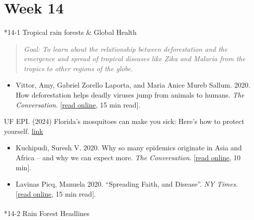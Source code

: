 \documentclass[
  10pt,
  letterpaper,
  oneside,
  open=any]{scrbook}
\makeatletter
\let\oldparagraph\paragraph
\renewcommand{\paragraph}{
    \@ifstar
      \xxxParagraphStar
      \xxxParagraphNoStar
  }
\newcommand{\xxxParagraphStar}[1]{\oldparagraph*{#1}\mbox{}}
\newcommand{\xxxParagraphNoStar}[1]{\oldparagraph{#1}\mbox{}}
\providecommand{\tightlist}{%
  \setlength{\itemsep}{0pt}\setlength{\parskip}{0pt}}
\makeatother
\begin{document}
\section*{Week 14}\label{week-14}


\paragraph*{14-1 Tropical rain forests \& Global
Health}\label{tropical-rain-forests-global-health}

\begin{quote}
\emph{Goal: To learn about the relationship between deforestation and
the emergence and spread of tropical diseases like Zika and Malaria from
the tropics to other regions of the globe}.
\end{quote}

\begin{itemize}
\tightlist
\item
  Vittor, Amy, Gabriel Zorello Laporta, and Maria Anice Mureb Sallum.
  2020. How deforestation helps deadly viruses jump from animals to
  humans. \emph{The Conversation}.
  {[}\href{https://theconversation.com/how-deforestation-helps-deadly-viruses-jump-from-animals-to-humans-139645}{read
  online}, 15 min read{]}.
\end{itemize}

UF EPI. (2024) Florida's mosquitoes can make you sick: Here's how to
protect yourself.
\href{https://epi.ufl.edu/2024/05/01/floridas-mosquitoes-can-make-you-sick-heres-how-to-protect-yourself/}{link}

\begin{itemize}
\item
  Kuchipudi, Suresh V. 2020. Why so many epidemics originate in Asia and
  Africa -- and why we can expect more. \emph{The Conversation}.
  {[}\href{https://theconversation.com/why-so-many-epidemics-originate-in-asia-and-africa-and-why-we-can-expect-more-131657}{read
  online}, 10 min{]}.
\item
  Lavinas Picq, Manuela 2020. ``Spreading Faith, and Disease''. \emph{NY
  Times}.
  {[}\href{https://www.nytimes.com/2020/10/02/opinion/amazon-missionaries-tribes-disease.html}{read
  online}, 15 min read{]}.
\end{itemize}

\paragraph*{14-2 Rain Forest Headlines}\label{rain-forest-headlines}
\end{document}
